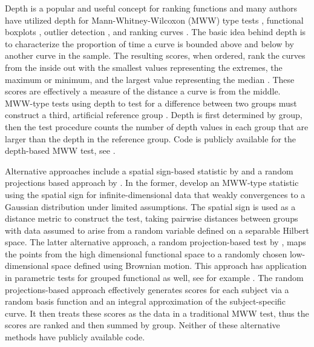 \documentclass[12pt]{article}
\theoremstyle{plain}
\theoremstyle{remark}
\begin{document}
	Depth is a popular and useful concept for ranking functions and many authors have utilized depth for Mann-Whitney-Wilcoxon (MWW) type tests \citep{Lopez2009,Lopez2010,Lopez2017}, functional boxplots \citep{Sun2011, Genton2014, Wrobel2016}, outlier detection \citep{SunGenton2012, Dai2018, Huang2019, Dai2020, AlemanGomez2022}, and ranking curves \citep{Lopez2009, Lopez2011, Sun2012, Sguera2021}. The basic idea behind depth is to characterize the proportion of time a curve is bounded above and below by another curve in the sample. The resulting scores, when ordered, rank the curves from the inside out with the smallest values representing the extremes, the maximum or minimum, and the largest value representing the median \citep{Lopez2009, Sun2012}. These scores are effectively a measure of the distance a curve is from the middle. MWW-type tests using depth to test for a difference between two groups must construct a third, artificial reference group  \citep{Lopez2009,Lopez2010,Lopez2017}. Depth is first determined by group, then the test procedure counts the number of depth values in each group that are larger than the depth in the reference group. Code is publicly available for the depth-based MWW test, see \cite{Lopez2017}.
	
	Alternative approaches include a spatial sign-based statistic by \cite{Chak2015} and a random projections based approach by \cite{Melendez2021}. In the former,  \cite{Chak2015} develop an MWW-type statistic using the spatial sign for infinite-dimensional data that weakly convergences to a Gaussian distribution under limited assumptions.  The spatial sign is used as a distance metric to construct the test, taking pairwise distances between groups with data assumed to arise from a random variable defined on a separable Hilbert space. The latter alternative approach, a random projection-based test by \cite{Melendez2021}, maps the points from the high dimensional functional space to a randomly chosen low-dimensional space defined using Brownian motion. This approach has application in parametric tests for grouped functional as well, see for example \cite{Cuesta2010}. The random projections-based approach effectively generates scores for each subject via a random basis function and an integral approximation of the subject-specific curve. It then treats these scores as the data in a traditional MWW test, thus the scores are ranked and then summed by group. Neither of these alternative methods have publicly available code.
	
\end{document}
